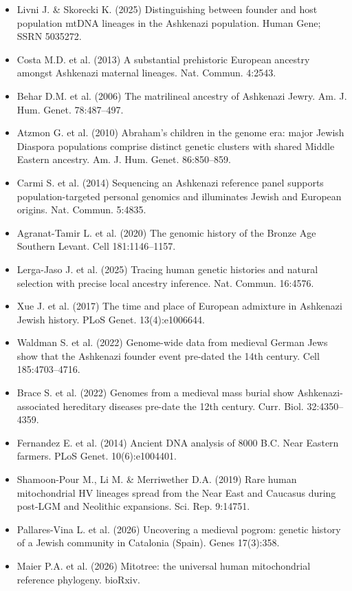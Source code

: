 \documentclass[11pt]{article}
\begin{document}
\begin{itemize}\small
\item Livni J. \& Skorecki K. (2025) Distinguishing between founder and host population mtDNA lineages in the Ashkenazi population. Human Gene; SSRN 5035272.
\item Costa M.D. et al. (2013) A substantial prehistoric European ancestry amongst Ashkenazi maternal lineages. Nat. Commun. 4:2543.
\item Behar D.M. et al. (2006) The matrilineal ancestry of Ashkenazi Jewry. Am. J. Hum. Genet. 78:487--497.
\item Atzmon G. et al. (2010) Abraham's children in the genome era: major Jewish Diaspora populations comprise distinct genetic clusters with shared Middle Eastern ancestry. Am. J. Hum. Genet. 86:850--859.
\item Carmi S. et al. (2014) Sequencing an Ashkenazi reference panel supports population-targeted personal genomics and illuminates Jewish and European origins. Nat. Commun. 5:4835.
\item Agranat-Tamir L. et al. (2020) The genomic history of the Bronze Age Southern Levant. Cell 181:1146--1157.
\item Lerga-Jaso J. et al. (2025) Tracing human genetic histories and natural selection with precise local ancestry inference. Nat. Commun. 16:4576.
\item Xue J. et al. (2017) The time and place of European admixture in Ashkenazi Jewish history. PLoS Genet. 13(4):e1006644.
\item Waldman S. et al. (2022) Genome-wide data from medieval German Jews show that the Ashkenazi founder event pre-dated the 14th century. Cell 185:4703--4716.
\item Brace S. et al. (2022) Genomes from a medieval mass burial show Ashkenazi-associated hereditary diseases pre-date the 12th century. Curr. Biol. 32:4350--4359.
\item Fernandez E. et al. (2014) Ancient DNA analysis of 8000 B.C. Near Eastern farmers. PLoS Genet. 10(6):e1004401.
\item Shamoon-Pour M., Li M. \& Merriwether D.A. (2019) Rare human mitochondrial HV lineages spread from the Near East and Caucasus during post-LGM and Neolithic expansions. Sci. Rep. 9:14751.
\item Pallares-Vina L. et al. (2026) Uncovering a medieval pogrom: genetic history of a Jewish community in Catalonia (Spain). Genes 17(3):358.
\item Maier P.A. et al. (2026) Mitotree: the universal human mitochondrial reference phylogeny. bioRxiv.

\end{itemize}
\end{document}
